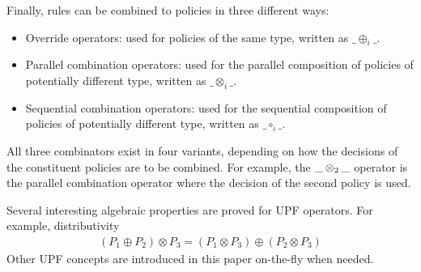 Finally, rules can be combined to policies in three different ways:
\begin{itemize}
\item Override operators: used for policies of the same type, written
  as $\_ \oplus_i \_$.
\item Parallel combination operators: used for the parallel
  composition of policies of potentially different type, written as
  $\_ \otimes_i \_$.
\item Sequential combination operators: used for the sequential
  composition of policies of potentially different type, written as
  $\_ \circ_i \_$.
\end{itemize}

All three combinators exist in four variants, depending on how the
decisions of the constituent policies are to be combined. For example,
the $\_ \operatorname{\otimes_2} \_$ operator is the parallel combination operator where the
decision of the second policy is used.

Several interesting algebraic properties are proved for UPF
operators. For example, distributivity
\begin{gather*}
( P_1 \oplus  P_2)  \otimes P_3  = ( P_1  \otimes P_3) \oplus ( P_2 \otimes P_3)
\end{gather*}
Other UPF concepts are introduced in this paper on-the-fly when
needed.

